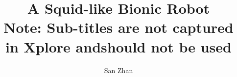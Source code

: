 
\setsansfont{Calibri}
\setmainfont{Calibri}

\graphicspath{{fig/}} %


\linespread{1.5} %



\renewcommand{\abstractnamefont}{\setmainfont{Times New Roman} \bfseries \slshape} %

\pagestyle{fancy}
\fancyhf{}

\fancyfoot[c]{\thepage\ \textbackslash \ \pageref{LastPage}} %

\renewcommand{\headrulewidth}{0mm} %

\title{A Squid-like Bionic Robot \\ {\footnotesize Note: Sub-titles are not captured in Xplore andshould not be used}}
\author{San Zhan} %
\date{} %

